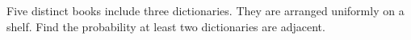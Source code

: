 Five distinct books include three dictionaries. They are arranged uniformly on a shelf. Find the probability at least two dictionaries are adjacent.
